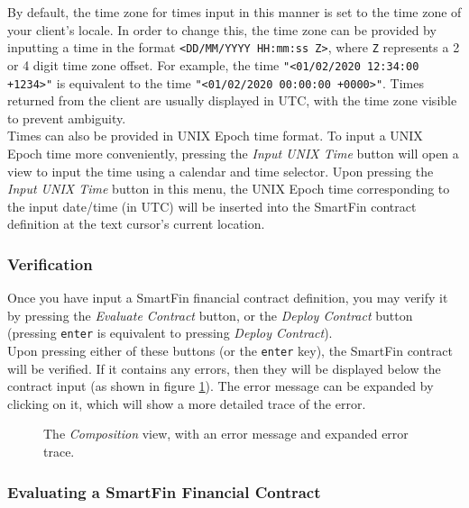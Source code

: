 By default, the time zone for times input in this manner is set to the time zone of your client's locale. In order to change this, the time zone can be provided by inputting a time in the format \texttt{<DD/MM/YYYY HH:mm:ss Z>}, where \texttt{Z} represents a 2 or 4 digit time zone offset. For example, the time \texttt{"<01/02/2020 12:34:00 +1234>"} is equivalent to the time \texttt{"<01/02/2020 00:00:00 +0000>"}. Times returned from the client are usually displayed in UTC, with the time zone visible to prevent ambiguity. \\

Times can also be provided in UNIX Epoch time format. To input a UNIX Epoch time more conveniently, pressing the \textit{Input UNIX Time} button will open a view to input the time using a calendar and time selector. Upon pressing the \textit{Input UNIX Time} button in this menu, the UNIX Epoch time corresponding to the input date/time (in UTC) will be inserted into the SmartFin contract definition at the text cursor's current location.

\subsubsection{Verification}

Once you have input a SmartFin financial contract definition, you may verify it by pressing the \textit{Evaluate Contract} button, or the \textit{Deploy Contract} button (pressing \texttt{enter} is equivalent to pressing \textit{Deploy Contract}). \\

Upon pressing either of these buttons (or the \texttt{enter} key), the SmartFin contract will be verified. If it contains any errors, then they will be displayed below the contract input (as shown in figure \ref{UG:fig:composition-error}). The error message can be expanded by clicking on it, which will show a more detailed trace of the error.

\begin{figure}[h]
    \centering
    \caption{The \textit{Composition} view, with an error message and expanded error trace.}
    \label{UG:fig:composition-error}
\end{figure}


\subsubsection{Evaluating a SmartFin Financial Contract}

